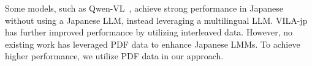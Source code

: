 Some models, such as Qwen-VL~\cite{bai2023qwen}, achieve strong performance in Japanese without using a Japanese LLM, instead leveraging a multilingual LLM.
VILA-jp~\cite{VILAjp} has further improved performance by utilizing interleaved data.
However, no existing work has leveraged PDF data to enhance Japanese LMMs.
To achieve higher performance, we utilize PDF data in our approach.